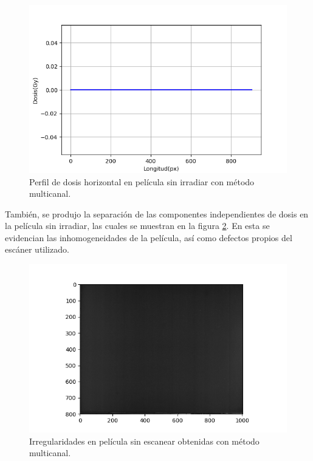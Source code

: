 \begin{figure}[H]
	\centering
	\includegraphics[width=0.7\linewidth]{images/perfilHorizontalDeDosisCeroMulticanal.png}
	\caption{Perfil de dosis horizontal en película sin irradiar con método multicanal. }
	\label{fig:perfilCero}
\end{figure}

También, se produjo la separación de las componentes independientes de dosis en la película sin irradiar, las cuales se muestran en la figura \ref{fig:irregularCero}. En esta se evidencian las inhomogeneidades de la película, así como defectos propios del escáner utilizado.\\ 
\begin{figure}[H]
	\centering
	\includegraphics[width=0.7\linewidth]{images/fondoIndependienteDosisPeliculaCero.png}
	\caption{Irregularidades en película sin escanear obtenidas con método multicanal. }
	\label{fig:irregularCero}
\end{figure}


